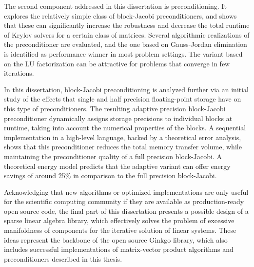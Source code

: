 The second component addressed in this dissertation is preconditioning. It
explores the relatively simple class of block-Jacobi preconditioners, and shows
that these can significantly increase the robustness and decrease the total
runtime of Krylov solvers for a certain class of matrices. Several algorithmic
realizations of the preconditioner are evaluated, and the one based on
Gauss-Jordan elimination is identified as performance winner in most problem
settings. The variant based on the LU factorization can be attractive for
problems that converge in few iterations.

In this dissertation, block-Jacobi preconditioning is analyzed further via an
initial study of the effects that single and half precision floating-point
storage have on this type of preconditioners. The resulting adaptive precision
block-Jacobi preconditioner dynamically assigns storage precisions to individual
blocks at runtime, taking into account the numerical properties of the blocks. A
sequential implementation in a high-level language, backed by a theoretical
error analysis, shows that this preconditioner reduces the total memory transfer
volume, while maintaining the preconditioner quality of a full precision
block-Jacobi.  A theoretical energy model predicts that the adaptive variant can
offer energy savings of around 25\% in comparison to the full precision
block-Jacobi.


Acknowledging that new algorithms or optimized implementations are only useful
for the scientific computing community if they are available as production-ready
open source code, the final part of this dissertation presents a possible design
of a sparse linear algebra library, which effectively solves the problem of
excessive manifoldness of components for the iterative solution of linear
systems. These ideas represent the backbone of the open source Ginkgo library,
which also includes successful implementations of matrix-vector product
algorithms and preconditioners described in this thesis.
